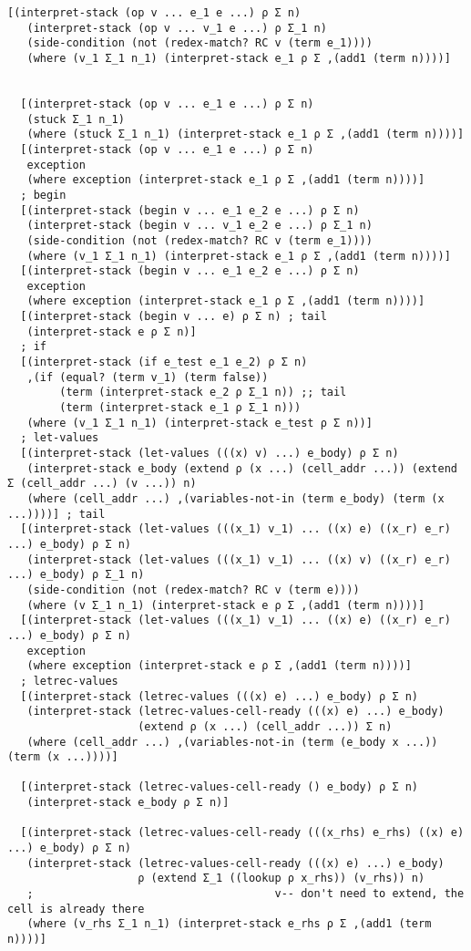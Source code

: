 \begin{lstlisting}[language=pltredex,
                basicstyle=\ttfamily\scriptsize,
                numbers=none, xleftmargin=2em]
  [(interpret-stack (op v ... e_1 e ...) ρ Σ n)
   (interpret-stack (op v ... v_1 e ...) ρ Σ_1 n)
   (side-condition (not (redex-match? RC v (term e_1))))
   (where (v_1 Σ_1 n_1) (interpret-stack e_1 ρ Σ ,(add1 (term n))))]


  [(interpret-stack (op v ... e_1 e ...) ρ Σ n)
   (stuck Σ_1 n_1)
   (where (stuck Σ_1 n_1) (interpret-stack e_1 ρ Σ ,(add1 (term n))))]
  [(interpret-stack (op v ... e_1 e ...) ρ Σ n)
   exception
   (where exception (interpret-stack e_1 ρ Σ ,(add1 (term n))))]
  ; begin
  [(interpret-stack (begin v ... e_1 e_2 e ...) ρ Σ n)
   (interpret-stack (begin v ... v_1 e_2 e ...) ρ Σ_1 n)
   (side-condition (not (redex-match? RC v (term e_1))))
   (where (v_1 Σ_1 n_1) (interpret-stack e_1 ρ Σ ,(add1 (term n))))]
  [(interpret-stack (begin v ... e_1 e_2 e ...) ρ Σ n)
   exception
   (where exception (interpret-stack e_1 ρ Σ ,(add1 (term n))))]
  [(interpret-stack (begin v ... e) ρ Σ n) ; tail
   (interpret-stack e ρ Σ n)]
  ; if
  [(interpret-stack (if e_test e_1 e_2) ρ Σ n)
   ,(if (equal? (term v_1) (term false))
        (term (interpret-stack e_2 ρ Σ_1 n)) ;; tail
        (term (interpret-stack e_1 ρ Σ_1 n)))
   (where (v_1 Σ_1 n_1) (interpret-stack e_test ρ Σ n))]
  ; let-values
  [(interpret-stack (let-values (((x) v) ...) e_body) ρ Σ n)
   (interpret-stack e_body (extend ρ (x ...) (cell_addr ...)) (extend Σ (cell_addr ...) (v ...)) n)
   (where (cell_addr ...) ,(variables-not-in (term e_body) (term (x ...))))] ; tail
  [(interpret-stack (let-values (((x_1) v_1) ... ((x) e) ((x_r) e_r) ...) e_body) ρ Σ n)
   (interpret-stack (let-values (((x_1) v_1) ... ((x) v) ((x_r) e_r) ...) e_body) ρ Σ_1 n)
   (side-condition (not (redex-match? RC v (term e))))
   (where (v Σ_1 n_1) (interpret-stack e ρ Σ ,(add1 (term n))))]
  [(interpret-stack (let-values (((x_1) v_1) ... ((x) e) ((x_r) e_r) ...) e_body) ρ Σ n)
   exception
   (where exception (interpret-stack e ρ Σ ,(add1 (term n))))]
  ; letrec-values
  [(interpret-stack (letrec-values (((x) e) ...) e_body) ρ Σ n)
   (interpret-stack (letrec-values-cell-ready (((x) e) ...) e_body)
                    (extend ρ (x ...) (cell_addr ...)) Σ n)
   (where (cell_addr ...) ,(variables-not-in (term (e_body x ...)) (term (x ...))))]

  [(interpret-stack (letrec-values-cell-ready () e_body) ρ Σ n)
   (interpret-stack e_body ρ Σ n)]

  [(interpret-stack (letrec-values-cell-ready (((x_rhs) e_rhs) ((x) e) ...) e_body) ρ Σ n)
   (interpret-stack (letrec-values-cell-ready (((x) e) ...) e_body)
                    ρ (extend Σ_1 ((lookup ρ x_rhs)) (v_rhs)) n)
   ;                                     v-- don't need to extend, the cell is already there
   (where (v_rhs Σ_1 n_1) (interpret-stack e_rhs ρ Σ ,(add1 (term n))))]


\end{lstlisting}
